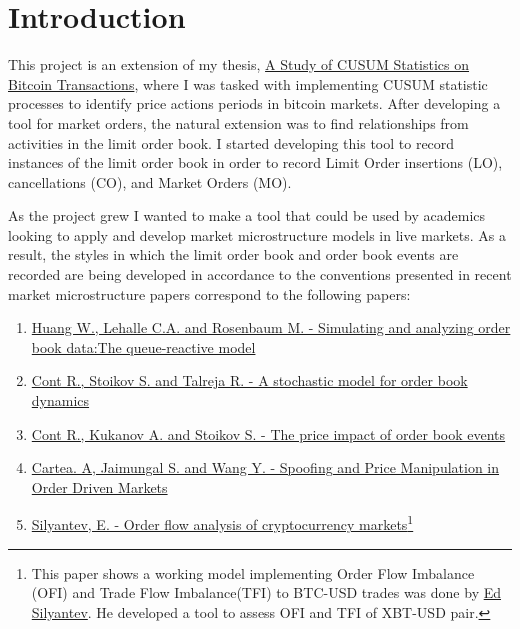 \section{Introduction} 
This project is an extension of my thesis, \href{"https://academicworks.cuny.edu/cgi/viewcontent.cgi?article=1682\&context=hc_sas_etds"}{ A Study of CUSUM Statistics on Bitcoin Transactions}, where I was tasked with implementing CUSUM statistic processes to identify price actions periods in bitcoin markets. After developing a tool for market orders, the natural extension was to find relationships from activities in the limit order book. I started developing this tool to record instances of the limit order book in order to record Limit Order insertions (LO), cancellations (CO), and Market Orders (MO).

As the project grew I wanted to make a tool that could be used by academics looking to apply and develop market microstructure models in live markets. As a result, the styles in which the limit order book and order book events are recorded are being developed in accordance to the conventions presented in recent market microstructure papers correspond to the following papers:
\begin{enumerate}
	\item \href{https://arxiv.org/pdf/1312.0563.pdf}{Huang W., Lehalle C.A. and Rosenbaum M. - Simulating and analyzing order book data:The queue-reactive model}\cite{Huang:2020}
	\item \href{https://citeseerx.ist.psu.edu/viewdoc/download?doi=10.1.1.139.1085\&rep=rep1\&type=pdf}{Cont R., Stoikov S. and Talreja R. - A stochastic model for order book dynamics}\cite{ContStoikovTalreja2009:StochModelOBD}
	
	\item \href{https://arxiv.org/pdf/1011.6402.pdf}{Cont R., Kukanov A. and Stoikov S. - The price impact of order book events}\cite{ContKukanovStoikov2012:PriceImpactOBE}
	
	\item \href{https://papers.ssrn.com/sol3/papers.cfm?abstract_id=3431139}{Cartea. A, Jaimungal S. and Wang Y. - Spoofing and Price Manipulation in Order Driven Markets}\cite{CarteaJaimungalWang2020:SpoofingPriceManipulation}
	
	\item \href{https://link.springer.com/article/10.1007/s42521-019-00007-w#article-info}{Silyantev, E. - Order flow analysis of cryptocurrency markets}\cite{Silyantev2019:Orderflowanalysis}\footnote{This paper shows a working model implementing Order Flow Imbalance (OFI) and Trade Flow Imbalance(TFI) to BTC-USD trades was done by \href{https://medium.com/@eliquinox/order-flow-analysis-of-cryptocurrency-markets-b479a0216ad8}{Ed Silyantev}. He developed a tool to assess OFI and TFI of XBT-USD pair. }
\end{enumerate}

